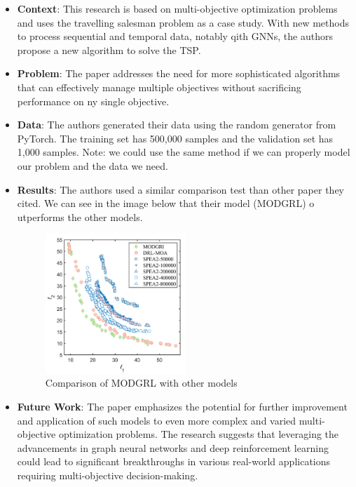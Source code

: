 \documentclass[10pt]{article}
\begin{document}
    \begin{itemize}
        \item \textbf{Context}:
        This research is based on multi-objective optimization problems and uses the travelling salesman problem as a case study.
        With new methods to process sequential and temporal data, notably qith GNNs, the authors propose a new algorithm to solve the TSP.
        \item \textbf{Problem}:
        The paper addresses the need for more sophisticated algorithms that can effectively manage multiple objectives without sacrificing performance on ny single objective.
        \item \textbf{Data}:
        The authors generated their data using the random generator from PyTorch.
        The training set has 500,000 samples and the validation set has 1,000 samples.
        Note: we could use the same method if we can properly model our problem and the data we need.
        \item \textbf{Results}:
        The authors used a similar comparison test than other paper they cited.
        We can see in the image below that their model (MODGRL) o utperforms the other models.
        \begin{figure}[H]
            \centering
            \includegraphics[width=0.5\textwidth]{resources/first_study_results}
            \caption{Comparison of MODGRL with other models}
            \label{fig:modgrl_comparison}
        \end{figure}
        \item \textbf{Future Work}:
        The paper emphasizes the potential for further improvement and application of such models to even more complex and varied multi-objective optimization problems.
        The research suggests that leveraging the advancements in graph neural networks and deep reinforcement learning could lead to significant breakthroughs in various real-world applications requiring multi-objective decision-making.
    \end{itemize}
\end{document}
